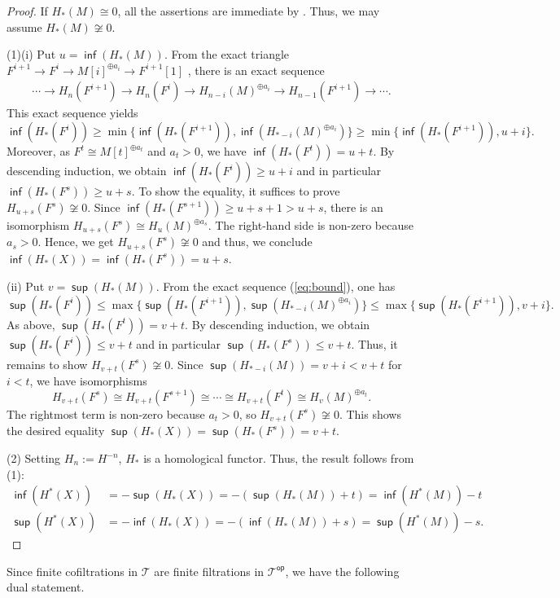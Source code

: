 \documentclass[10pt, a4paper,reqno]{amsart}
\theoremstyle{definition}
\theoremstyle{remark}
\numberwithin{equation}{thm}
\def\cT{\mathcal{T}}
\def\sup{\operatorname{\mathsf{sup}}}
\def\inf{\operatorname{\mathsf{inf}}}
\def\op{\mathsf{op}}
\begin{document}
\begin{proof}
If $H_*(M) \cong 0$, all the assertions are immediate by .
Thus, we may assume $H_*(M) \not\cong 0$.

(1)(i)
Put $u = \inf(H_*(M))$.
From the exact triangle $F^{i+1} \to F^{i} \to M[i]^{\oplus a_i} \to F^{i+1}[1]$	, there is an exact sequence
\begin{align}\label{eq:bound}
\cdots \to H_n(F^{i+1}) \to H_n(F^{i}) \to H_{n-i}(M)^{\oplus a_i} \to H_{n-1}(F^{i+1}) \to \cdots. 
\end{align}
This exact sequence yields
\[
\inf(H_*(F^i)) \ge \min\{\inf(H_*(F^{i+1})), \inf(H_{*-i}(M)^{\oplus a_i})\} \ge \min\{\inf(H_*(F^{i+1})), u+i\}.
\]
Moreover, as $F^{t} \cong M[t]^{\oplus a_t}$ and $a_t > 0$, we have $\inf(H_*(F^t)) = u+t$.
By descending induction, we obtain $\inf(H_*(F^i)) \ge u+i$ and in particular $\inf(H_*(F^s)) \ge u+s$.
To show the equality, it suffices to prove $H_{u+s}(F^s) \not\cong 0$.
Since $\inf(H_{*}(F^{s+1})) \ge u+s+1 > u+s$, there is an isomorphism $H_{u+s}(F^s) \cong H_{u}(M)^{\oplus a_s}$.
The right-hand side is non-zero because $a_s > 0$.
Hence, we get $H_{u+s}(F^s) \not\cong 0$ and thus, we conclude $\inf(H_*(X)) = \inf(H_*(F^s)) = u+s$.

(ii)
Put $v = \sup(H_*(M))$.
From the exact sequence (\ref{eq:bound}), one has 
\[
\sup(H_*(F^i)) \le \max\{\sup(H_*(F^{i+1})), \sup(H_{*-i}(M)^{\oplus a_i})\} \le \max\{\sup(H_*(F^{i+1})), v+i\}.
\]
As above, $\sup(H_*(F^t)) = v+t$.
By descending induction, we obtain $\sup(H_*(F^i)) \le v+t$ and in particular $\sup(H_*(F^s)) \le v+t$.
Thus, it remains to show $H_{v+t}(F^s) \not\cong 0$.
Since $\sup(H_{*-i}(M)) = v+i < v+t$ for $i<t$, we have isomorphisms
\[
H_{v+t}(F^s) \cong H_{v+t}(F^{s+1}) \cong \cdots \cong H_{v+t}(F^{t}) \cong H_v(M)^{\oplus a_t}.
\] 
The rightmost term is non-zero because $a_t > 0$, so $H_{v+t}(F^s) \not\cong 0$.
This shows the desired equality $\sup(H_*(X)) = \sup(H_*(F^s)) = v + t$.

(2)
Setting $H_n := H^{-n}$, $H_*$ is a homological functor.
Thus, the result follows from (1):
\begin{align*}
\inf(H^*(X)) &= -\sup(H_*(X)) = - (\sup(H_*(M)) +t) = \inf(H^*(M)) -t \\
\sup(H^*(X)) &= - \inf(H_*(X)) = - (\inf(H_*(M)) +s) = \sup(H^*(M)) -s.
\end{align*}
\end{proof}

Since finite cofiltrations in $\cT$ are finite filtrations in $\cT^\op$, we have the following dual statement.
\end{document}
